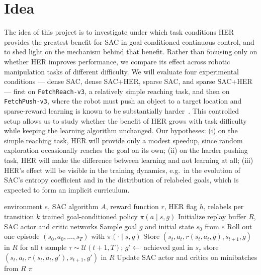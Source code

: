 \documentclass{article}
\begin{document}
\section{Idea}
The idea of this project is to investigate under which task conditions HER
provides the greatest benefit for SAC in goal-conditioned continuous control,
and to shed light on the mechanism behind that benefit. Rather than focusing
only on whether HER improves performance, we compare its effect across
robotic manipulation tasks of different difficulty. We will evaluate four
experimental conditions --- dense SAC, dense SAC+HER, sparse SAC, and sparse
SAC+HER --- first on \texttt{FetchReach-v3}, a relatively simple reaching
task, and then on \texttt{FetchPush-v3}, where the robot must push an object
to a target location and sparse-reward learning is known to be substantially
harder~\cite{andrychowicz17}. This controlled setup allows us to study
whether the benefit of HER grows with task difficulty while keeping the
learning algorithm unchanged. Our hypotheses: (i) on the simple reaching
task, HER will provide only a modest speedup, since random exploration
occasionally reaches the goal on its own; (ii) on the harder pushing task,
HER will make the difference between learning and not learning at all;
(iii) HER's effect will be visible in the training dynamics, e.g.\ in the
evolution of SAC's entropy coefficient and in the distribution of relabeled
goals, which is expected to form an implicit curriculum.

\begin{algorithm}[H]
    \caption{SAC with optional Hindsight Experience Replay (\emph{future} strategy)}
    \label{alg:code}
    \begin{algorithmic}
        \Require environment $e$, SAC algorithm $A$, reward function $r$,
                 HER flag $h$, relabels per transition $k$
        \Ensure trained goal-conditioned policy $\pi(a \mid s, g)$
        \State Initialize replay buffer $R$, SAC actor and critic networks
            \State Sample goal $g$ and initial state $s_0$ from $e$
            \State Roll out one episode $(s_0, a_0, \dots, s_T)$ with $\pi(\cdot \mid s, g)$
            \State Store $(s_t, a_t, r(s_t, a_t, g), s_{t+1}, g)$ in $R$ for all $t$
                    \State sample $\tau \sim \mathcal{U}(t+1, T)$;\;
                           $g' \gets$ achieved goal in $s_\tau$
                    \State store $(s_t, a_t, r(s_t, a_t, g'), s_{t+1}, g')$ in $R$
                \EndFor
            \EndIf
            \State Update SAC actor and critics on minibatches from $R$
        \EndWhile
        \State \Return $\pi$
    \end{algorithmic}
\end{algorithm}
\end{document}
